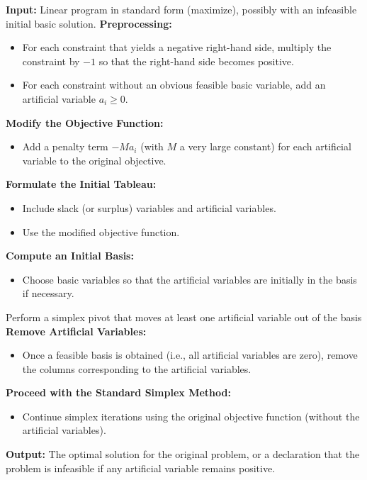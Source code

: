 \begin{algorithm}[H]
\caption{Big-M Method for Linear Programming}
\begin{algorithmic}[1]
\State \textbf{Input:} Linear program in standard form (maximize), possibly with an infeasible initial basic solution.
\State \textbf{Preprocessing:}
    \begin{itemize}
        \item For each constraint that yields a negative right-hand side, multiply the constraint by \(-1\) so that the right-hand side becomes positive.
        \item For each constraint without an obvious feasible basic variable, add an artificial variable \(a_i \ge 0\).
    \end{itemize}
\State \textbf{Modify the Objective Function:}
    \begin{itemize}
        \item Add a penalty term \(-M a_i\) (with \(M\) a very large constant) for each artificial variable to the original objective.
    \end{itemize}
\State \textbf{Formulate the Initial Tableau:}
    \begin{itemize}
        \item Include slack (or surplus) variables and artificial variables.
        \item Use the modified objective function.
    \end{itemize}
\State \textbf{Compute an Initial Basis:}
    \begin{itemize}
        \item Choose basic variables so that the artificial variables are initially in the basis if necessary.
    \end{itemize}
    \State Perform a simplex pivot that moves at least one artificial variable out of the basis
\EndWhile
\State \textbf{Remove Artificial Variables:}
    \begin{itemize}
        \item Once a feasible basis is obtained (i.e., all artificial variables are zero), remove the columns corresponding to the artificial variables.
    \end{itemize}
\State \textbf{Proceed with the Standard Simplex Method:}
    \begin{itemize}
        \item Continue simplex iterations using the original objective function (without the artificial variables).
    \end{itemize}
\State \textbf{Output:} The optimal solution for the original problem, or a declaration that the problem is infeasible if any artificial variable remains positive.
\end{algorithmic}
\end{algorithm}

